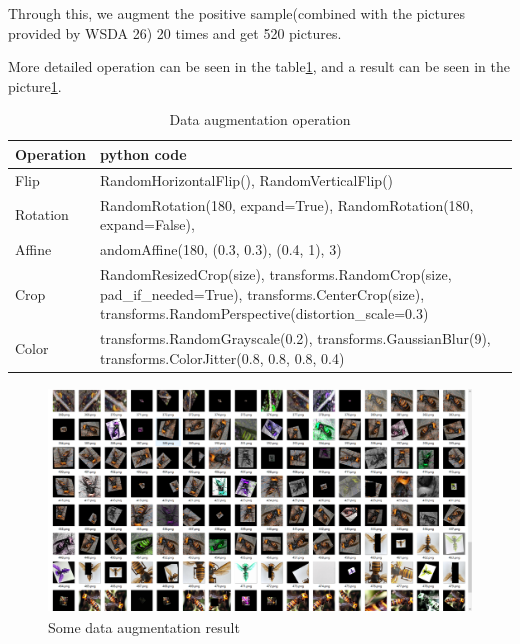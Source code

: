 \documentclass[12pt]{article}
\begin{document}
Through this, we augment the positive sample(combined with the pictures provided by WSDA 26) 20 times and get 520 pictures.

More detailed operation can be seen in the table\ref{augm}, and a result can be seen in the picture\ref{augres}.

\begin{table}[H]
	\caption{Data augmentation operation}  \label{augm}
	\small
	\begin{center}  
		\begin{tabular}{|p{2cm}<{\centering}|p{14cm}|}  
			\hline  
			Operation &   python code\footnotemark[2]\\ \hline  
			Flip& RandomHorizontalFlip(),
			RandomVerticalFlip()\\ \hline  
			Rotation &RandomRotation(180, expand=True),
			RandomRotation(180, expand=False),\\  
			\hline 
			Affine& andomAffine(180, (0.3, 0.3), (0.4, 1), 3) \\  
			\hline  
			   Crop&RandomResizedCrop(size), 
			   transforms.RandomCrop(size, pad\_if\_needed=True),
			   transforms.CenterCrop(size),
			   transforms.RandomPerspective(distortion\_scale=0.3) \\  
			\hline
			 Color &  transforms.RandomGrayscale(0.2),
			 transforms.GaussianBlur(9),
			 transforms.ColorJitter(0.8, 0.8, 0.8, 0.4)\\  
			\hline
	
		\end{tabular}  
	\end{center}  
\end{table}


\begin{figure}[H]
	\small
	\centering
	\includegraphics[width=14cm,height=6cm]{./pictures/angres.png}
	\caption{Some data augmentation result}\label{augres}
\end{figure}
\end{document}
